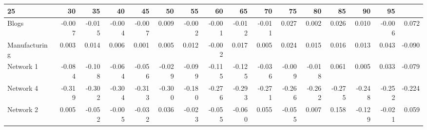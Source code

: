 \begin{tabular}{@{}lrrrrrrrrrrrrrrr@{}}
\toprule

25 & 30 & 35 & 40 & 45 & 50 & 55 & 60 & 65 & 70 & 75 & 80 & 85 & 90 & 95 \\\midrule

Blogs & -0.007 & -0.015 & -0.004 & -0.007 & 0.009 & -0.002 & -0.001 & -0.012 & -0.011 & 0.027 & 0.002 & 0.026 & 0.010 & -0.006 & 0.072 \\
Manufacturing & 0.003 & 0.014 & 0.006 & 0.001 & 0.005 & 0.012 & -0.002 & 0.017 & 0.005 & 0.024 & 0.015 & 0.016 & 0.013 & 0.043 & -0.090 \\
Network
1 & -0.084 & -0.108 & -0.064 & -0.056 & -0.029 & -0.099 & -0.115 & -0.125 & -0.036 & -0.009 & -0.018 & 0.061 & 0.005 & 0.033 & -0.079 \\
Network
4 & -0.319 & -0.302 & -0.304 & -0.313 & -0.300 & -0.180 & -0.276 & -0.293 & -0.271 & -0.266 & -0.262 & -0.275 & -0.248 & -0.252 & -0.224 \\
Network
2 & 0.005 & -0.052 & -0.005 & -0.032 & 0.036 & -0.023 & -0.055 & -0.060 & 0.055 & -0.055 & 0.007 & 0.158 & -0.129 & -0.021 & 0.059 \\

\bottomrule
\end{tabular}
